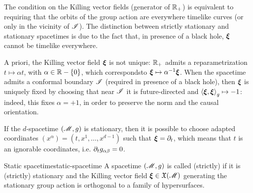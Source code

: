 The condition on the Killing vector fields (generator of $ \mathbb{R}_+ $) is equivalent to requiring that the orbits of the group action are everywhere timelike curves (or only in the vicinity of $ \mathscr{I} $). The distinction between strictly stationary and stationary spacetimes is due to the fact that, in presence of a black hole, $ \boldsymbol{\xi} $ cannot be timelike everywhere.

A priori, the Killing vector field $ \boldsymbol{\xi} $ is not unique: $ \mathbb{R}_+ $ admits a reparametrization $ t \mapsto \alpha t $, with $ \alpha \in \mathbb{R} - \{0\} $, which corresponds\footnotemark to $ \boldsymbol{\xi} \mapsto \alpha^{-1} \boldsymbol{\xi} $. When the spacetime admits a conformal boundary $ \mathscr{I} $ (required in presence of a black hole), then $ \boldsymbol{\xi} $ is uniquely fixed by choosing that near $ \mathscr{I} $ it is future-directed and $ \braket{\boldsymbol{\xi} , \boldsymbol{\xi}}_g \mapsto -1 $: indeed, this fixes $ \alpha = +1 $, in order to preserve the norm and the causal orientation.

If the $ d $-spacetime $ (\mathscr{M} , g) $ is stationary, then it is possible to choose adapted coordinates $ (x^\alpha) = (t , x^1 , \dots , x^{d-1}) $ such that $ \boldsymbol{\xi} = \partial_t $, which means that $ t $ is an ignorable coordinates, i.e. $ \partial_t g_{\alpha \beta} = 0 $.


\begin{definition}{Static spacetime}{static-spacetime}
  A spacetime $ (\mathscr{M} , g) $ is called (strictly)  if it is (strictly) stationary and the Killing vector field $ \boldsymbol{\xi} \in \mathfrak{X}(\mathscr{M}) $ generating the stationary group action is orthogonal to a family of hypersurfaces.
\end{definition}

